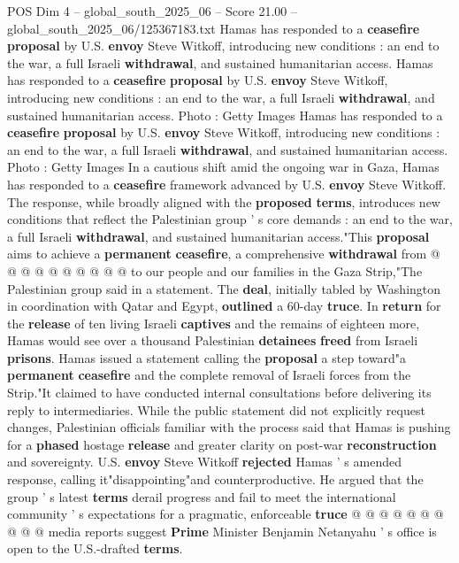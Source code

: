 \begin{textsample}{POS Dim 4 – global\_south\_2025\_06 – Score 21.00 – global\_south\_2025\_06/125367183.txt}  \label{ex:f4_pos_352}
Hamas has responded to a \textbf{ceasefire} \textbf{proposal} by U.S. \textbf{envoy} Steve Witkoff, introducing new conditions : an end to the war, a full Israeli \textbf{withdrawal}, and sustained humanitarian access.
Hamas has responded to a \textbf{ceasefire} \textbf{proposal} by U.S. \textbf{envoy} Steve Witkoff, introducing new conditions : an end to the war, a full Israeli \textbf{withdrawal}, and sustained humanitarian access.
Photo : Getty Images Hamas has responded to a \textbf{ceasefire} \textbf{proposal} by U.S. \textbf{envoy} Steve Witkoff, introducing new conditions : an end to the war, a full Israeli \textbf{withdrawal}, and sustained humanitarian access.
Photo : Getty Images In a cautious shift amid the ongoing war in Gaza, Hamas has responded to a \textbf{ceasefire} framework advanced by U.S. \textbf{envoy} Steve Witkoff.
The response, while broadly aligned with the \textbf{proposed} \textbf{terms}, introduces new conditions that reflect the Palestinian group ' s core demands : an end to the war, a full Israeli \textbf{withdrawal}, and sustained humanitarian access."This \textbf{proposal} aims to achieve a \textbf{permanent} \textbf{ceasefire}, a comprehensive \textbf{withdrawal} from @ @ @ @ @ @ @ @ @ @ to our people and our families in the Gaza Strip,"The Palestinian group said in a statement.
The \textbf{deal}, initially tabled by Washington in coordination with Qatar and Egypt, \textbf{outlined} a 60-day \textbf{truce}.
In \textbf{return} for the \textbf{release} of ten living Israeli \textbf{captives} and the remains of eighteen more, Hamas would see over a thousand Palestinian \textbf{detainees} \textbf{freed} from Israeli \textbf{prisons}.
Hamas issued a statement calling the \textbf{proposal} a step toward"a \textbf{permanent} \textbf{ceasefire} and the complete removal of Israeli forces from the Strip."It claimed to have conducted internal consultations before delivering its reply to intermediaries.
While the public statement did not explicitly request changes, Palestinian officials familiar with the process said that Hamas is pushing for a \textbf{phased} hostage \textbf{release} and greater clarity on post-war \textbf{reconstruction} and sovereignty.
U.S. \textbf{envoy} Steve Witkoff \textbf{rejected} Hamas ' s amended response, calling it"disappointing"and counterproductive.
He argued that the group ' s latest \textbf{terms} derail progress and fail to meet the international community ' s expectations for a pragmatic, enforceable \textbf{truce} @ @ @ @ @ @ @ @ @ @ media reports suggest \textbf{Prime} Minister Benjamin Netanyahu ' s office is open to the U.S.-drafted \textbf{terms}.

\end{textsample}
